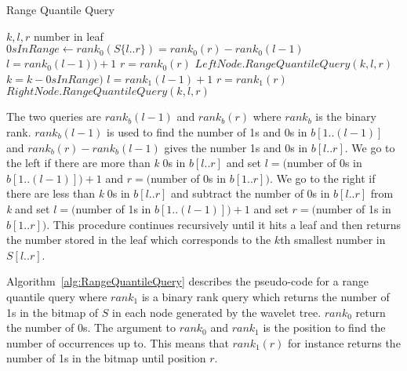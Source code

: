 \begin{algorithm}
\caption{Range Quantile Query}
\label{alg:RangeQuantileQuery}
\begin{algorithmic}
 {$k,l,r$}
	\State \Return number in leaf
\EndIf
\State $\textit{0}sInRange \gets rank_0(S \lbrace l..r \rbrace) = rank_0(r) - rank_0(l-1)$
	\State $l = rank_0(l-1))+1$
	\State $r = rank_0(r)$
	\State \Return $LeftNode.RangeQuantileQuery(k,l,r)$
\Else
	\State $k = k - \textit{0}sInRange)$
	\State $l = rank_1(l-1)+1$
	\State $r = rank_1(r)$
	\State \Return $RightNode.RangeQuantileQuery(k,l,r)$
\EndIf

\EndFunction
\end{algorithmic}
\end{algorithm}

The two queries are $rank_b(l-1)$ and $rank_b(r)$ where $rank_b$ is the binary rank.
$rank_b(l-1)$ is used to find the number of 1s and 0s in $b[1..(l-1)]$ and $rank_b(r) - rank_b(l-1)$ gives the number 1s and 0s in $b[l..r]$. 
We go to the left if there are more than \textit{k} 0s in $b[l..r]$ and set $l = ($number of 0s in $b[1..(l-1)])+1$ and $r=($number of 0s in $b[1..r])$. 
We go to the right if there are less than \textit{k} 0s in $b[l..r]$ and subtract the number of 0s in $b[l..r]$ from \textit{k} and set $l = ($number of 1s in $b[1..(l-1)])+1$ and set $r=($number of 1s in $b[1..r])$. 
This procedure continues recursively until it hits a leaf and then returns the number stored in the leaf which corresponds to the $k$th smallest number in $S[l..r]$.

Algorithm~\ref{alg:RangeQuantileQuery} describes the pseudo-code for a range quantile query where $rank_1$ is a binary rank query which returns the number of 1s in the bitmap of $S$ in each node generated by the wavelet tree. 
$rank_0$ return the number of 0s.
The argument to $rank_0$ and $rank_1$ is the position to find the number of occurrences up to.
This means that $rank_1(r)$ for instance returns the number of 1s in the bitmap until position $r$.

